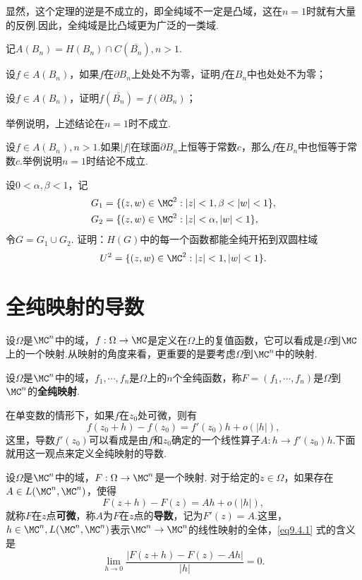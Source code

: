 显然，这个定理的逆是不成立的，即全纯域不一定是凸域，这在$n=1$时就有大量的反例.因此，全纯域是比凸域更为广泛的一类域.
\begin{xiti}
\item 记$A(B_n)=H(B_n)\cap C(\bar{B_n}),n>1$.
\begin{enuma}
\item 设$f\in A(B_n)$，如果$f$在$\partial B_n$上处处不为零，证明$f$在$B_n$中也处处不为零；
\item 设$f\in A(B_n)$，证明$f(\bar{B_n})=f(\partial B_n)$；
\item 举例说明，上述结论在$n=1$时不成立.
\end{enuma}
\item 设$f\in A(B_n),n>1$.如果$|f|$在球面$\partial B_n$上恒等于常数$c$，那么$f$在$B_n$中也恒等于常数$c$.举例说明$n=1$时结论不成立.
\item 设$0<\alpha,\beta<1$，记
\begin{align*}
&G_1=\{(z,w)\in\MC^2:|z|<1,\beta<|w|<1\},\\
&G_2=\{(z,w)\in\MC^2:|z|<\alpha,|w|<1\},
\end{align*}
令$G=G_1\cup G_2$. 证明：$H(G)$中的每一个函数都能全纯开拓到双圆柱域
\[U^2=\{(z,w)\in\MC^2:|z|<1,|w|<1\}.\]
\end{xiti}

\section{全纯映射的导数\label{sec9.4}}
设$\Omega$是$\MC^n$中的域，$f:\Omega\to \MC$是定义在$\Omega$上的复值函数，它可以看成是$\Omega$到$\MC$上的一个映射.从映射的角度来看，更重要的是要考虑$\Omega$到$\MC^n$中的映射.
\begin{theorem}\label{def9.4.1}
设$\Omega$是$\MC^n$中的域，$f_1,\cdots,f_n$是$\Omega$上的$n$个全纯函数，称$F=(f_1,\cdots,f_n)$是$\Omega$到$\MC^n$的\textbf{全纯映射}.
\end{theorem}

在单变数的情形下，如果$f$在$z_0$处可微，则有
\[f(z_0+h)-f(z_0)=f'(z_0)h+o(|h|),\]
这里，导数$f'(z_0)$可以看成是由$f$和$z_0$确定的一个线性算子$A:h\to f'(z_0)h$.下面就用这一观点来定义全纯映射的导数.

\begin{definition}\label{def9.4.2}
设$\Omega$是$\MC^n$中的域，$F:\Omega\to\MC^n$是一个映射. 对于给定的$z\in\Omega$，如果存在$A\in L(\MC^n,\MC^n)$，使得
\begin{equation}\label{eq9.4.1}
F(z+h)-F(z)=Ah+o(|h|),
\end{equation}
就称$F$在$z$点\textbf{可微}，称$A$为$F$在$z$点的\textbf{导数}，记为$F'(z)=A$.这里，$h\in \MC^n,L(\MC^n,\MC^n)$表示$\MC^n\to\MC^n$的线性映射的全体，\eqref{eq9.4.1} 式的含义是
\[\lim_{h\to0}\frac{|F(z+h)-F(z)-Ah|}{|h|}=0.\]
\end{definition}

